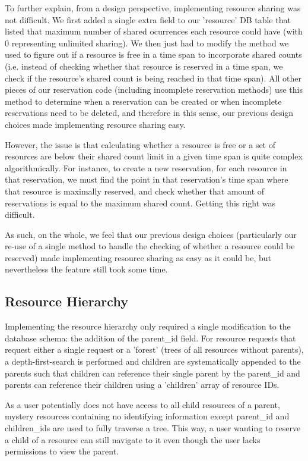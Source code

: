 \documentclass[12pt]{article}
\begin{document}
To further explain, from a design perspective, implementing resource sharing was not difficult. We first added a single extra field to our 'resource' DB table that listed that maximum number of shared ocurrences each resource could have (with 0 representing unlimited sharing). We then just had to modify the method we used to figure out if a resource is free in a time span to incorporate shared counts (i.e. instead of checking whether that resource is reserved in a time span, we check if the resource's shared count is being reached in that time span). All other pieces of our reservation code (including incomplete reservation methods) use this method to determine when a reservation can be created or when incomplete reservations need to be deleted, and therefore in this sense, our previous design choices made implementing resource sharing easy. 

However, the issue is that calculating whether a resource is free or a set of resources are below their shared count limit in a given time span is quite complex algorithmically. For instance, to create a new reservation, for each resource in that reservation, we must find the point in that reservation's time span where that resource is maximally reserved, and check whether that amount of reservations is equal to the maximum shared count. Getting this right was difficult. 

As such, on the whole, we feel that our previous design choices (particularly our re-use of a single method to handle the checking of whether a resource could be reserved) made implementing resource sharing as easy as it could be, but nevertheless the feature still took some time. 

\subsection{Resource Hierarchy}

Implementing the resource hierarchy only required a single modification to the database schema: the addition of the parent\_id field. For resource requests that request either a single request or a 'forest' (trees of all resources without parents), a depth-first-search is performed and children are systematically appended to the parents such that children can reference their single parent by the parent\_id and parents can reference their children using a 'children' array of resource IDs. 

As a user potentially does not have access to all child resources of a parent, mystery resources containing no identifying information except parent\_id and children\_ids are used to fully traverse a tree. This way, a user wanting to reserve a child of a resource can still navigate to it even though the user lacks permissions to view the parent. 
\end{document}
